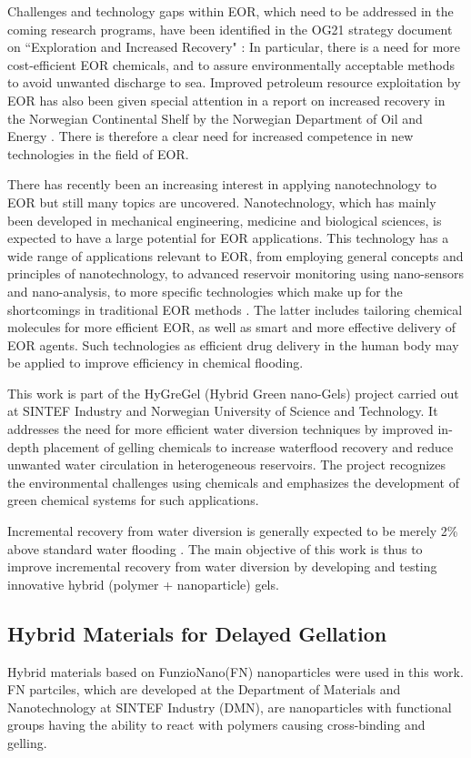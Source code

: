 \documentclass[journal = enfuem, manuscript =  article]{achemso}
\begin{document}
Challenges and technology gaps within EOR, which need to be addressed in the coming research programs, have been identified in the OG21 strategy document on ``Exploration and Increased Recovery" \citep{OG21}: In particular, there is a need for more cost-efficient EOR chemicals, and to assure environmentally acceptable methods to avoid unwanted discharge to sea. Improved petroleum resource exploitation by EOR has also been given special attention in a report on increased recovery in the Norwegian Continental Shelf by the Norwegian Department of Oil and Energy \citep{Am2010}. There is therefore a clear need for increased competence in new technologies in the field of EOR. 

There has recently been an increasing interest in applying nanotechnology to EOR but still many topics are uncovered. Nanotechnology, which has mainly been developed in mechanical engineering, medicine and biological sciences, is expected to have a large potential for EOR applications. This technology has a wide range of applications relevant to EOR, from employing general concepts and principles of nanotechnology, to advanced reservoir monitoring using nano-sensors and nano-analysis, to more specific technologies which make up for the shortcomings in traditional EOR methods \citep{Fletcher2010, Ayatollahi2012, Cocuzza2011}. The latter includes tailoring chemical molecules for more efficient EOR, as well as smart and more effective delivery of EOR agents. Such technologies as efficient drug delivery in the human body may be applied to improve efficiency in chemical flooding.

This work is part of the HyGreGel (Hybrid Green nano-Gels) project carried out at SINTEF Industry and Norwegian University of Science and Technology. It addresses the need for more efficient water diversion techniques by improved in-depth placement of gelling chemicals to increase waterflood recovery and reduce unwanted water circulation in heterogeneous reservoirs. The project recognizes the environmental challenges using chemicals and emphasizes the development of green chemical systems for such applications.

Incremental recovery from water diversion is generally expected to be merely 2\% above standard water flooding \citep{OG21}. The main objective of this work is thus to improve incremental recovery from water diversion by developing and testing innovative hybrid (polymer + nanoparticle) gels.

\subsection{Hybrid Materials for Delayed Gellation}
Hybrid materials based on FunzioNano\texttrademark (FN) nanoparticles were used in this work. FN partciles, which are developed at  the  Department  of  Materials  and  Nanotechnology at  SINTEF  Industry (DMN), are nanoparticles with functional groups having the ability to react with polymers causing cross-binding and gelling. 
\end{document}
